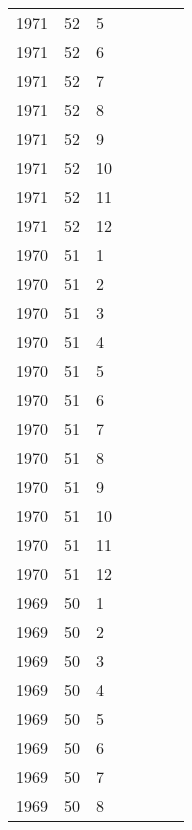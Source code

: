 \begin{longtable}{ |l|l|l|l|p{2.7cm}|l|p{2cm}| }
 1971 & 52 &     5 &         &                &  & \\
 1971 & 52 &     6 &         &                &  & \\
 1971 & 52 &     7 &         &                &  & \\
 1971 & 52 &     8 &         &                &  & \\
 1971 & 52 &     9 &         &                &  & \\
 1971 & 52 &    10 &         &                &  & \\
 1971 & 52 &    11 &         &                &  & \\
 1971 & 52 &    12 &         &                &  & \\
 1970 & 51 &     1 &         &                &  & \\
 1970 & 51 &     2 &         &                &  & \\
 1970 & 51 &     3 &         &                &  & \\
 1970 & 51 &     4 &         &                &  & \\
 1970 & 51 &     5 &         &                &  & \\
 1970 & 51 &     6 &         &                &  & \\
 1970 & 51 &     7 &         &                &  & \\
 1970 & 51 &     8 &         &                &  & \\
 1970 & 51 &     9 &         &                &  & \\
 1970 & 51 &    10 &         &                &  & \\
 1970 & 51 &    11 &         &                &  & \\
 1970 & 51 &    12 &         &                &  & \\
 1969 & 50 &     1 &         &                &  & \\
 1969 & 50 &     2 &         &                &  & \\
 1969 & 50 &     3 &         &                &  & \\
 1969 & 50 &     4 &         &                &  & \\
 1969 & 50 &     5 &         &                &  & \\
 1969 & 50 &     6 &         &                &  & \\
 1969 & 50 &     7 &         &                &  & \\
 1969 & 50 &     8 &         &                &  & \\

\end{longtable}
